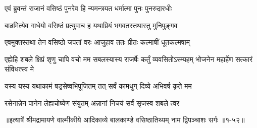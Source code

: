 \twolineshloka
{एवं ब्रुवन्तं राजानं वसिष्ठं पुनरेव हि}
{न्यमन्त्रयत धर्मात्मा पुनः पुनरुदारधीः} %

\twolineshloka
{बाढमित्येव गाधेयो वसिष्ठं प्रत्युवाच ह}
{यथाप्रियं भगवतस्तथास्तु मुनिपुङ्गव} %

\twolineshloka
{एवमुक्तस्तथा तेन वसिष्ठो जपतां वरः}
{आजुहाव ततः प्रीतः कल्माषीं धूतकल्मषाम्} %

\threelineshloka
{एह्येहि शबले क्षिप्रं शृणु चापि वचो मम}
{सबलस्यास्य राजर्षेः कर्तुं व्यवसितोऽस्म्यहम्}
{भोजनेन महार्हेण सत्कारं संविधत्स्व मे} %

\twolineshloka
{यस्य यस्य यथाकामं षड्रसेष्वभिपूजितम्}
{तत् सर्वं कामधुग् दिव्ये अभिवर्ष कृते मम} %

\twolineshloka
{रसेनान्नेन पानेन लेह्यचोष्येण संयुतम्}
{अन्नानां निचयं सर्वं सृजस्व शबले त्वर} %


॥इत्यार्षे श्रीमद्रामायणे वाल्मीकीये आदिकाव्ये बालकाण्डे वसिष्ठातिथ्यम् नाम द्विपञ्चाशः सर्गः ॥१-५२॥
